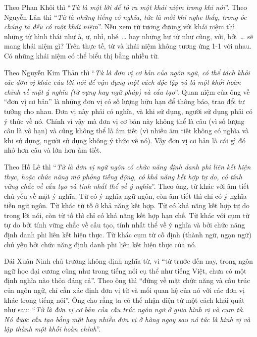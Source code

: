 \documentclass[a4paper,oneside,14pt]{extbook} %
\begin{document}
Theo Phan Khôi thì ``\textit{Từ là một lời để tỏ ra một khái niệm trong khi
nói}''. Theo Nguyễn Lân thì ``\textit{Từ là những tiếng có nghĩa, tức là mỗi khi
nghe thấy, trong óc chúng ta đều có một khái niệm}''. Nếu xem từ tương
đương với khái niệm thì những từ hình thái như à, ư, nhỉ, nhé~\ldots{}
hay những hư từ như cũng, với, bởi~\ldots{} sẽ mang khái niệm gì? Trên
thực tế, từ và khái niệm không tương ứng 1-1 với nhau. Có những khái
niệm có thể biểu thị bằng nhiều từ.

Theo Nguyễn Kim Thản thì ``\textit{Từ là đơn vị cơ bản của ngôn ngữ, có thể
tách khỏi các đơn vị khác của lời nói để vận dụng một cách độc lập và
là một khối hoàn chỉnh về mặt ý nghĩa (từ vựng hay ngữ pháp) và cấu
tạo}''. Quan niệm của ông về ``đơn vị cơ bản'' là những đơn vị có số
lượng hữu hạn để thông báo, trao đổi tư tưởng cho nhau. Đơn vị này
phải có nghĩa, và khi sử dụng, người sử dụng phải có ý thức về
nó. Chính vì vậy mà đơn vị cơ bản này không thể là câu (vì số lượng
câu là vô hạn) và cũng không thể là âm tiết (vì nhiều âm tiết không có
nghĩa và khi sử dụng, người sử dụng không ý thức về nó). Vậy đơn vị cơ
bản là cái gì đó nhỏ hơn câu và lớn hơn âm tiết.

Theo Hồ Lê thì ``\textit{Từ là đơn vị ngữ ngôn có chức năng định danh phi liên
kết hiện thực, hoặc chức năng mô phỏng tiếng động, có khả năng kết hợp
tự do, có tính vững chắc về cấu tạo và tính nhất thể về ý
nghĩa}''. Theo ông, từ khác với âm tiết chủ yếu về mặt ý nghĩa. Từ có
ý nghĩa ngữ ngôn, còn âm tiết thì chỉ có ý nghĩa tiền ngữ ngôn. Từ
khác từ tố ở khả năng kết hợp. Từ có khả năng kết hợp tự do trong lời
nói, còn từ tố thì chỉ có khả năng kết hợp hạn chế. Từ khác với cụm từ
tự do bởi tính vững chắc về cấu tạo, tính nhất thể về ý nghĩa và bởi
chức năng định danh phi liên kết hiện thực. Từ khác cụm từ cố định
(thành ngữ, ngạn ngữ) chủ yếu bởi chức năng định danh phi liên kết
hiện thực của nó.

Đái Xuân Ninh chủ trương không định nghĩa từ, vì ``từ trước đến nay,
trong ngôn ngữ học đại cương cũng như trong tiếng nói cụ thể như tiếng
Việt, chưa có một định nghĩa nào thỏa đáng cả''. Theo ông thì ``đứng
về mặt chức năng và cấu trúc của ngôn ngữ, chỉ cần xác định đơn vị từ
và mối quan hệ của nó với các đơn vị khác trong tiếng nói''. Ông cho
rằng ta có thể nhận diện từ một cách khái quát như sau: ``\textit{Từ
  là đơn vị cơ bản của cấu trúc ngôn ngữ ở giữa hình vị và cụm từ. Nó
  được cấu tạo bằng một hay nhiều đơn vị ở hàng ngay sau nó tức là
  hình vị và lập thành một khối hoàn chỉnh}''.
\end{document}
